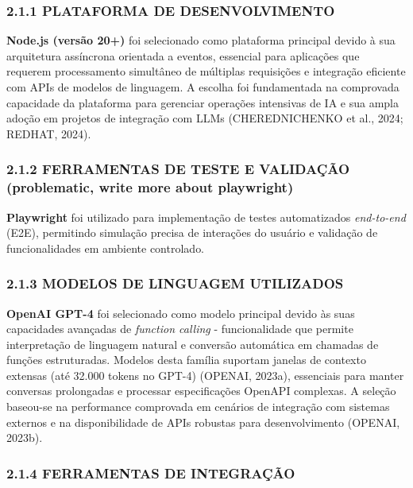 \documentclass[
]{article}
\begin{document}
\subsubsection{2.1.1 PLATAFORMA DE
DESENVOLVIMENTO}\label{plataforma-de-desenvolvimento}

\textbf{Node.js (versão 20+)} foi selecionado como plataforma principal
devido à sua arquitetura assíncrona orientada a eventos, essencial para
aplicações que requerem processamento simultâneo de múltiplas
requisições e integração eficiente com APIs de modelos de linguagem. A
escolha foi fundamentada na comprovada capacidade da plataforma para
gerenciar operações intensivas de IA e sua ampla adoção em projetos de
integração com LLMs (CHEREDNICHENKO et al., 2024; REDHAT, 2024).

\subsubsection{2.1.2 FERRAMENTAS DE TESTE E VALIDAÇÃO (problematic,
write more about
playwright)}\label{ferramentas-de-teste-e-validauxe7uxe3o-problematic-write-more-about-playwright}

\textbf{Playwright} foi utilizado para implementação de testes
automatizados \emph{end-to-end} (E2E), permitindo simulação precisa de
interações do usuário e validação de funcionalidades em ambiente
controlado.

\subsubsection{2.1.3 MODELOS DE LINGUAGEM
UTILIZADOS}\label{modelos-de-linguagem-utilizados}

\textbf{OpenAI GPT-4} foi selecionado como modelo principal devido às
suas capacidades avançadas de \emph{function calling} - funcionalidade
que permite interpretação de linguagem natural e conversão automática em
chamadas de funções estruturadas. Modelos desta família suportam janelas
de contexto extensas (até 32.000 tokens no GPT-4) (OPENAI, 2023a),
essenciais para manter conversas prolongadas e processar especificações
OpenAPI complexas. A seleção baseou-se na performance comprovada em
cenários de integração com sistemas externos e na disponibilidade de
APIs robustas para desenvolvimento (OPENAI, 2023b).

\subsubsection{2.1.4 FERRAMENTAS DE
INTEGRAÇÃO}\label{ferramentas-de-integrauxe7uxe3o}
\end{document}
